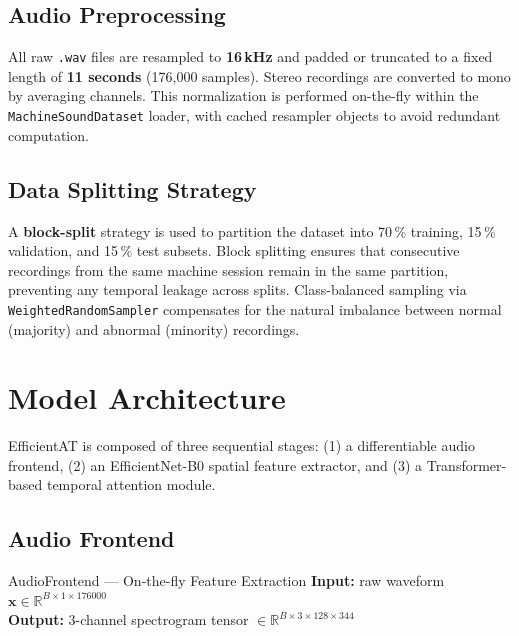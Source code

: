 \documentclass[12pt,a4paper]{article}
\begin{document}
\subsection{Audio Preprocessing}

All raw \texttt{.wav} files are resampled to \textbf{16\,kHz} and padded or truncated to a fixed length of \textbf{11 seconds} (176{,}000 samples). Stereo recordings are converted to mono by averaging channels. This normalization is performed on-the-fly within the \texttt{MachineSoundDataset} loader, with cached resampler objects to avoid redundant computation.

\subsection{Data Splitting Strategy}

A \textbf{block-split} strategy is used to partition the dataset into 70\,\% training, 15\,\% validation, and 15\,\% test subsets. Block splitting ensures that consecutive recordings from the same machine session remain in the same partition, preventing any temporal leakage across splits. Class-balanced sampling via \texttt{WeightedRandomSampler} compensates for the natural imbalance between normal (majority) and abnormal (minority) recordings.

\section{Model Architecture}

EfficientAT is composed of three sequential stages: (1) a differentiable audio frontend, (2) an EfficientNet-B0 spatial feature extractor, and (3) a Transformer-based temporal attention module.

\subsection{Audio Frontend}

\begin{resultbox}{AudioFrontend — On-the-fly Feature Extraction}
  \textbf{Input:} raw waveform \(\mathbf{x} \in \mathbb{R}^{B \times 1 \times 176000}\)\\
  \textbf{Output:} 3-channel spectrogram tensor \(\in \mathbb{R}^{B \times 3 \times 128 \times 344}\)
\end{resultbox}
\end{document}
